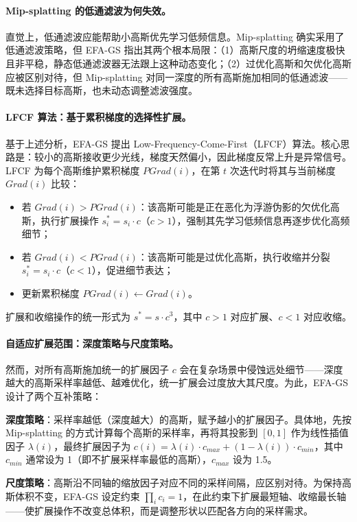 \paragraph{Mip-splatting 的低通滤波为何失效。}直觉上，低通滤波应能帮助小高斯优先学习低频信息。Mip-splatting 确实采用了低通滤波策略，但 EFA-GS 指出其两个根本局限：（1）高斯尺度的坍缩速度极快且非平稳，静态低通滤波器无法跟上这种动态变化；（2）过优化高斯和欠优化高斯应被区别对待，但 Mip-splatting 对同一深度的所有高斯施加相同的低通滤波——既未选择目标高斯，也未动态调整滤波强度。

\paragraph{LFCF 算法：基于累积梯度的选择性扩展。}基于上述分析，EFA-GS 提出 Low-Frequency-Come-First（LFCF）算法。核心思路是：较小的高斯接收更少光线，梯度天然偏小，因此梯度反常上升是异常信号。LFCF 为每个高斯维护累积梯度 $PGrad(i)$，在第 $t$ 次迭代时将其与当前梯度 $Grad(i)$ 比较：
\begin{itemize}
    \item 若 $Grad(i) > PGrad(i)$：该高斯可能是正在恶化为浮游伪影的欠优化高斯，执行扩展操作 $s_i^* = s_i \cdot c$（$c > 1$），强制其先学习低频信息再逐步优化高频细节；
    \item 若 $Grad(i) < PGrad(i)$：该高斯可能是过优化高斯，执行收缩并分裂 $s_i^* = s_i \cdot c$（$c < 1$），促进细节表达；
    \item 更新累积梯度 $PGrad(i) \leftarrow Grad(i)$。
\end{itemize}
扩展和收缩操作的统一形式为 $s^* = s \cdot c^3$，其中 $c > 1$ 对应扩展、$c < 1$ 对应收缩。

\paragraph{自适应扩展范围：深度策略与尺度策略。}然而，对所有高斯施加统一的扩展因子 $c$ 会在复杂场景中侵蚀远处细节——深度越大的高斯采样率越低、越难优化，统一扩展会过度放大其尺度。为此，EFA-GS 设计了两个互补策略：

\textbf{深度策略}：采样率越低（深度越大）的高斯，赋予越小的扩展因子。具体地，先按 Mip-splatting 的方式计算每个高斯的采样率，再将其投影到 $[0,1]$ 作为线性插值因子 $\lambda(i)$，最终扩展因子为 $c(i) = \lambda(i) \cdot c_{max} + (1 - \lambda(i)) \cdot c_{min}$，其中 $c_{min}$ 通常设为 1（即不扩展采样率最低的高斯），$c_{max}$ 设为 1.5。

\textbf{尺度策略}：高斯沿不同轴的缩放因子对应不同的采样间隔，应区别对待。为保持高斯体积不变，EFA-GS 设定约束 $\prod_i c_i = 1$，在此约束下扩展最短轴、收缩最长轴——使扩展操作不改变总体积，而是调整形状以匹配各方向的采样需求。

